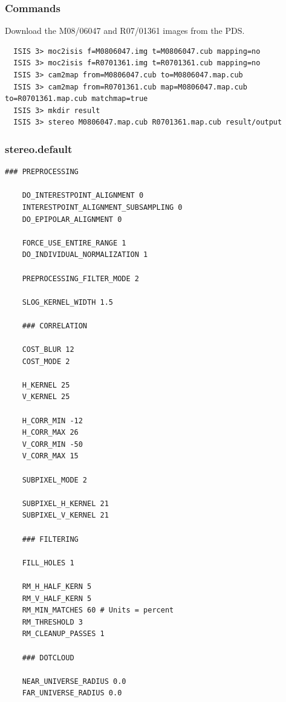 \subsubsection*{Commands}

Download the M08/06047 and R07/01361 images from the \ac{PDS}.
\begin{verbatim}
  ISIS 3> moc2isis f=M0806047.img t=M0806047.cub mapping=no
  ISIS 3> moc2isis f=R0701361.img t=R0701361.cub mapping=no
  ISIS 3> cam2map from=M0806047.cub to=M0806047.map.cub
  ISIS 3> cam2map from=R0701361.cub map=M0806047.map.cub to=R0701361.map.cub matchmap=true
  ISIS 3> mkdir result
  ISIS 3> stereo M0806047.map.cub R0701361.map.cub result/output
\end{verbatim}

\subsubsection*{stereo.default}

\begin{center}\begin{minipage}{5.5in}
\begin{Verbatim}[frame=single,fontsize=\small,label=stereo.default for MOC Ceraunius Tholus]
    ### PREPROCESSING

    DO_INTERESTPOINT_ALIGNMENT 0
    INTERESTPOINT_ALIGNMENT_SUBSAMPLING 0
    DO_EPIPOLAR_ALIGNMENT 0

    FORCE_USE_ENTIRE_RANGE 1
    DO_INDIVIDUAL_NORMALIZATION 1

    PREPROCESSING_FILTER_MODE 2

    SLOG_KERNEL_WIDTH 1.5

    ### CORRELATION

    COST_BLUR 12
    COST_MODE 2

    H_KERNEL 25
    V_KERNEL 25

    H_CORR_MIN -12
    H_CORR_MAX 26
    V_CORR_MIN -50
    V_CORR_MAX 15

    SUBPIXEL_MODE 2

    SUBPIXEL_H_KERNEL 21
    SUBPIXEL_V_KERNEL 21

    ### FILTERING

    FILL_HOLES 1

    RM_H_HALF_KERN 5
    RM_V_HALF_KERN 5
    RM_MIN_MATCHES 60 # Units = percent
    RM_THRESHOLD 3
    RM_CLEANUP_PASSES 1

    ### DOTCLOUD

    NEAR_UNIVERSE_RADIUS 0.0
    FAR_UNIVERSE_RADIUS 0.0
\end{Verbatim}
\end{minipage}\end{center}

